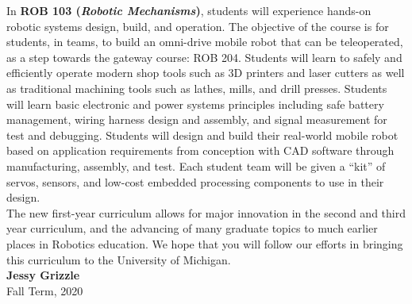In \textbf{ROB 103 ({\em Robotic Mechanisms})}, students will experience hands-on robotic systems design, build, and operation.  The objective of the course is for students, in teams, to build an omni-drive mobile robot that can be teleoperated, as a step towards the gateway course: ROB 204.  Students will learn to safely and efficiently operate modern shop tools such as 3D printers and laser cutters as well as traditional machining tools such as lathes, mills, and drill presses.  Students will learn basic electronic and power systems principles including safe battery management, wiring harness design and assembly, and signal measurement for test and debugging. Students will design and build their real-world mobile robot based on application requirements from conception with CAD software through manufacturing, assembly, and test.  Each student team will be given a ``kit'' of servos, sensors, and low-cost embedded processing components to use in their design.\\

The new first-year curriculum allows for major innovation in the second and third year curriculum, and the advancing of many graduate topics to much earlier places in Robotics education. We hope that you will follow our efforts in bringing this curriculum to the University of Michigan.\\

\textbf{Jessy Grizzle}\\
Fall Term, 2020